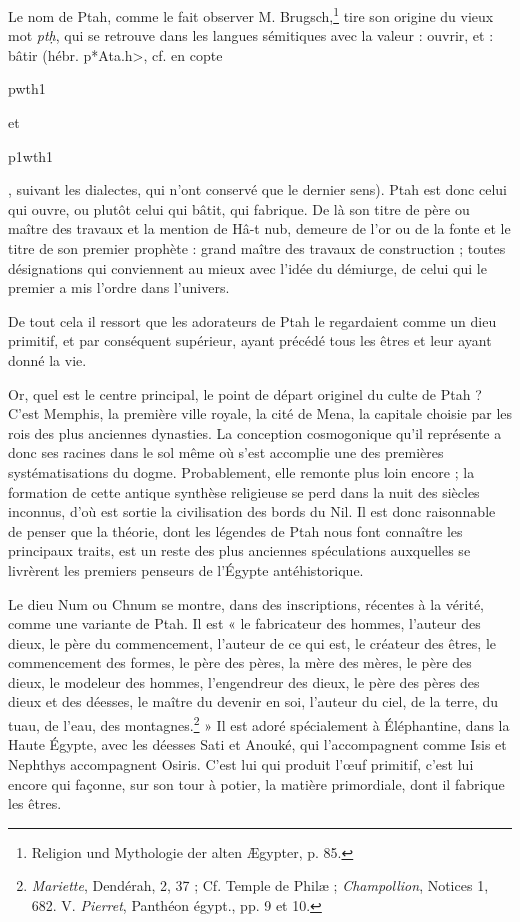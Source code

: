 \documentclass[letterpaper,twocolumn,openany,nodeprecatedcode]{dndbook}
\begin{document}
Le nom de Ptah, comme le fait observer M. Brugsch,\footnote{Religion und Mythologie der alten Ægypter, p. 85.} tire son origine du vieux mot \emph{ptḥ}, qui se retrouve dans les langues sémitiques avec la valeur : ouvrir, et : bâtir (hébr. \foreignlanguage{hebrew}{\<p*Ata.h>}, cf. en copte \begin{coptic}pwth1\end{coptic} et \begin{coptic}p1wth1\end{coptic}, suivant les dialectes, qui n'ont conservé que le dernier sens). Ptah est donc celui qui ouvre, ou plutôt celui qui bâtit, qui fabrique. De là son titre de père ou maître des travaux et la mention de Hâ-t nub, demeure de l'or ou de la fonte et le titre de son premier prophète : grand maître des travaux de construction ; toutes désignations qui conviennent au mieux avec l'idée du démiurge, de celui qui le premier a mis l'ordre dans l'univers.

De tout cela il ressort que les adorateurs de Ptah le regardaient comme un dieu primitif, et par conséquent supérieur, ayant précédé tous les êtres et leur ayant donné la vie.

Or, quel est le centre principal, le point de départ originel du culte de Ptah ? C'est Memphis, la première ville royale, la cité de Mena, la capitale choisie par les rois des plus anciennes dynasties. La conception cosmogonique qu'il représente a donc ses racines dans le sol même où s'est accomplie une des premières systématisations du dogme. Probablement, elle remonte plus loin encore ; la formation de cette antique synthèse religieuse se perd dans la nuit des siècles inconnus, d'où est sortie la civilisation des bords du Nil. Il est donc raisonnable de penser que la théorie, dont les légendes de Ptah nous font connaître les principaux traits, est un reste des plus anciennes spéculations auxquelles se livrèrent les premiers penseurs de l'Égypte antéhistorique.

Le dieu Num ou Chnum se montre, dans des inscriptions, récentes à la vérité, comme une variante de Ptah. Il est « le fabricateur des hommes, l'auteur des dieux, le père du commencement, l'auteur de ce qui est, le créateur des êtres, le commencement des formes, le père des pères, la mère des mères, le père des dieux, le modeleur des hommes, l'engendreur des dieux, le père des pères des dieux et des déesses, le maître du devenir en soi, l'auteur du ciel, de la terre, du tuau, de l'eau, des montagnes.\footnote{\emph{Mariette}, Dendérah, 2, 37 ; Cf. Temple de Philæ ; \emph{Champollion}, Notices 1, 682. V. \emph{Pierret}, Panthéon égypt., pp. 9 et 10.} » Il est adoré spécialement à Éléphantine, dans la Haute Égypte, avec les déesses Sati et Anouké, qui l'accompagnent comme Isis et Nephthys accompagnent Osiris. C'est lui qui produit l'œuf primitif, c'est lui encore qui façonne, sur son tour à potier, la matière primordiale, dont il fabrique les êtres.
\end{document}
